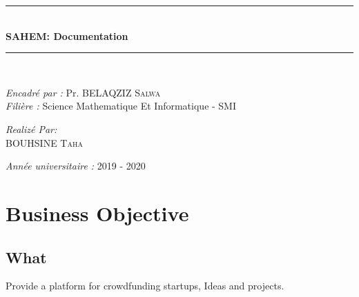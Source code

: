\documentclass[11pt, openany]{report}
\newcommand{\HRule}{\rule{\linewidth}{0.5mm}}
\begin{document}
\begin{titlepage}
\begin{sffamily}
\begin{center}
    \HRule \\[0.4cm]
    { \huge \bfseries  SAHEM: Documentation \\[0.4cm] }

    \HRule \\[2cm]
    \begin{minipage}{0.6\textwidth}
      \begin{flushleft} \large
        \emph{Encadré par : } Pr. \textsc{BELAQZIZ Salwa}\\
        \emph{Filière : } Science Mathematique Et Informatique - SMI \\
        
      \end{flushleft}
    \end{minipage}
    \newline \vskip1.5cm
    \begin{minipage}{0.5\textwidth}
      \begin{center} \large
        \emph{Realizé Par:} \\
                            \textsc{BOUHSINE Taha}\\
                         
      \end{center}
    \end{minipage}
    \vskip1.5cm
    \vfill

    {\large \emph{Année universitaire : } 2019 - 2020}

  \end{center}
  \end{sffamily}
  \thispagestyle{empty}
\end{titlepage}


\clearpage





\renewcommand{\baselinestretch}{1.30}\small \normalsize

\tableofcontents
\listoffigures
\listoftables
\renewcommand{\baselinestretch}{1.18}\small \normalsize
\newpage
{}

\chapter{ Business Objective }
\section{What}
Provide a platform for crowdfunding startups, Ideas and projects.
\end{document}
